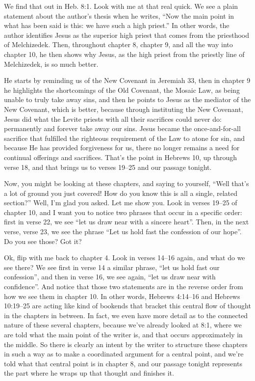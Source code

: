 \documentclass[letterpaper, 12pt]{article}
\begin{document}
    We find that out in Heb. 8:1. Look with me at that real quick. We
    see a plain statement about the author's thesis when he writes,
    ``Now the main point in what has been said is this: we have such a
    high priest.'' In other words, the author identifies Jesus as the
    superior high priest that comes from the priesthood of Melchizedek.
    Then, throughout chapter 8, chapter 9, and all the way into chapter
    10, he then shows why Jesus, as the high priest from the priestly
    line of Melchizedek, is so much better.

    He starts by reminding us of the New Covenant in Jeremiah 33, then
    in chapter 9 he highlights the shortcomings of the Old Covenant, the
    Mosaic Law, as being unable to truly take away sins, and then he
    points to Jesus as the mediator of the New Covenant, which is
    better, because through instituting the New Covenant, Jesus did what
    the Levite priests with all their sacrifices could never do:
    permanently and forever take away our sins. Jesus became the
    once-and-for-all sacrifice that fulfilled the righteous requirement
    of the Law to atone for sin, and because He has provided forgiveness
    for us, there no longer remains a need for continual offerings and
    sacrifices. That's the point in Hebrews 10, up through verse 18, and
    that brings us to verses 19--25 and our passage tonight.

    Now, you might be looking at these chapters, and saying to yourself,
    ``Well that's a lot of ground you just covered! How do you know this
    is all a single, related section?'' Well, I'm glad you asked. Let me
    show you. Look in verses 19--25 of chapter 10, and I want you to
    notice two phrases that occur in a specific order: first in verse
    22, we see ``let us draw near with a sincere heart''. Then, in the
    next verse, verse 23, we see the phrase ``Let us hold fast the
    confession of our hope''. Do you see those? Got it?

    Ok, flip with me back to chapter 4. Look in verses 14--16 again, and
    what do we see there? We see first in verse 14 a similar phrase,
    ``let us hold fast our confession'', and then in verse 16, we see
    again, ``let us draw near with confidence''. And notice that those
    two statements are in the reverse order from how we see them in
    chapter 10. In other words, Hebrews 4:14--16 and Hebrews 10:19--25
    are acting like kind of bookends that bracket this central flow of
    thought in the chapters in between. In fact, we even have more
    detail as to the connected nature of these several chapters, because
    we've already looked at 8:1, where we are told what the main point
    of the writer is, and that occurs approximately in the middle. So
    there is clearly an intent by the writer to structure these chapters
    in such a way as to make a coordinated argument for a central point,
    and we're told what that central point is in chapter 8, and our
    passage tonight represents the part where he wraps up that thought
    and finishes it.
\end{document}
